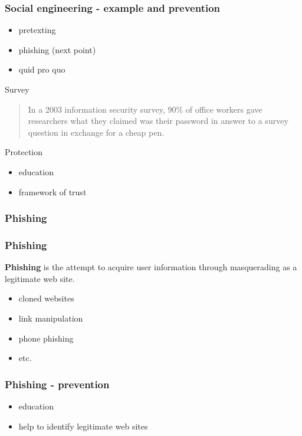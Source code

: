 \begin{frame}
\frametitle{Social engineering - example and prevention}
\begin{itemize}
\item pretexting
\item phishing \small{(next point)}
\item quid pro quo
\end{itemize}
\begin{exampleblock}{Survey}
\begin{quote}
In a 2003 information security survey, 90\% of office workers gave
researchers what they claimed was their password in answer to a survey
question in exchange for a cheap pen.
\end{quote}
\end{exampleblock}
\begin{block}{Protection}
\begin{itemize}
\item education
\item framework of trust
\end{itemize}
\end{block}
\end{frame}

\subsubsection{Phishing}

\begin{frame}
\frametitle{Phishing}
\textbf{Phishing} is the attempt to acquire user information through
masquerading as a legitimate web site.
\begin{itemize}
\item cloned websites
\item link manipulation
\item phone phishing
\item etc.
\end{itemize}
\end{frame}

\begin{frame}
\frametitle{Phishing - prevention}
\begin{itemize}
\item education
\item help to identify legitimate web sites
\end{itemize}
\end{frame}

